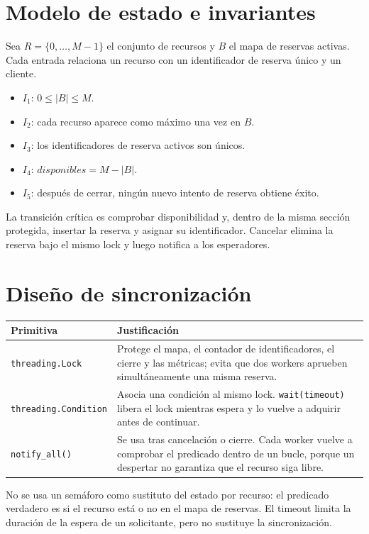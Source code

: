 \documentclass[12pt,a4paper]{article}
\begin{document}
\section{Modelo de estado e invariantes}
Sea $R=\{0,\ldots,M-1\}$ el conjunto de recursos y $B$ el mapa de reservas activas. Cada entrada relaciona un recurso con un identificador de reserva único y un cliente.
\begin{itemize}
\item $I_1$: $0\leq |B|\leq M$.
\item $I_2$: cada recurso aparece como máximo una vez en $B$.
\item $I_3$: los identificadores de reserva activos son únicos.
\item $I_4$: $disponibles=M-|B|$.
\item $I_5$: después de cerrar, ningún nuevo intento de reserva obtiene éxito.
\end{itemize}
La transición crítica es comprobar disponibilidad y, dentro de la misma sección protegida, insertar la reserva y asignar su identificador. Cancelar elimina la reserva bajo el mismo lock y luego notifica a los esperadores.
\section{Diseño de sincronización}
\begin{table}[H]\centering\small
\begin{tabularx}{\linewidth}{p{3cm}X}
\toprule
\textbf{Primitiva} & \textbf{Justificación}\\\midrule
\texttt{threading.Lock} & Protege el mapa, el contador de identificadores, el cierre y las métricas; evita que dos workers aprueben simultáneamente una misma reserva.\\
\texttt{threading.Condition} & Asocia una condición al mismo lock. \texttt{wait(timeout)} libera el lock mientras espera y lo vuelve a adquirir antes de continuar.\\
\texttt{notify\_all()} & Se usa tras cancelación o cierre. Cada worker vuelve a comprobar el predicado dentro de un bucle, porque un despertar no garantiza que el recurso siga libre.\\
\bottomrule
\end{tabularx}\end{table}
No se usa un semáforo como sustituto del estado por recurso: el predicado verdadero es si el recurso está o no en el mapa de reservas. El timeout limita la duración de la espera de un solicitante, pero no sustituye la sincronización.
\end{document}
